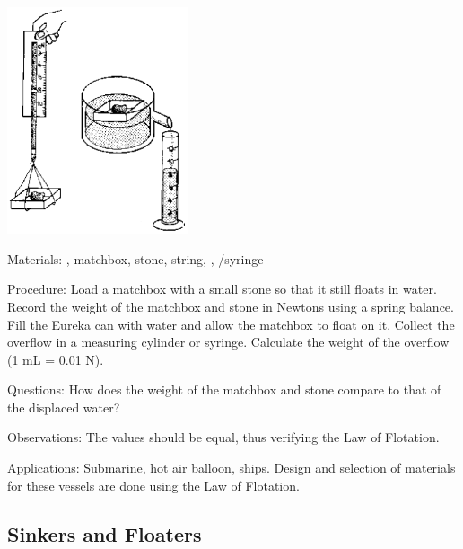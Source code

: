 \begin{multicols}{2}
\begin{center}
\includegraphics[width=0.4\textwidth]{./img/source/flotation.png}
\end{center}

\begin{description*}
\item[Materials:]{, matchbox, stone, string, , /syringe}
\item[Procedure:]{Load a matchbox with a small stone so that it still floats in water. Record the weight of the matchbox and stone in Newtons using a spring balance. Fill the Eureka can with water and allow the matchbox to float on it. Collect the overflow in a measuring cylinder or syringe. Calculate the weight of the overflow (1 mL = 0.01 N).}
\item[Questions:]{How does the weight of the matchbox and stone compare to that of the displaced water?}
\item[Observations:]{The values should be equal, thus verifying the Law of Flotation.}
\item[Applications:]{Submarine, hot air balloon, ships. Design and selection of materials for these vessels are done using the Law of Flotation.}
\end{description*}

\vfill
\columnbreak

\subsection{Sinkers and Floaters}


\end{multicols}
